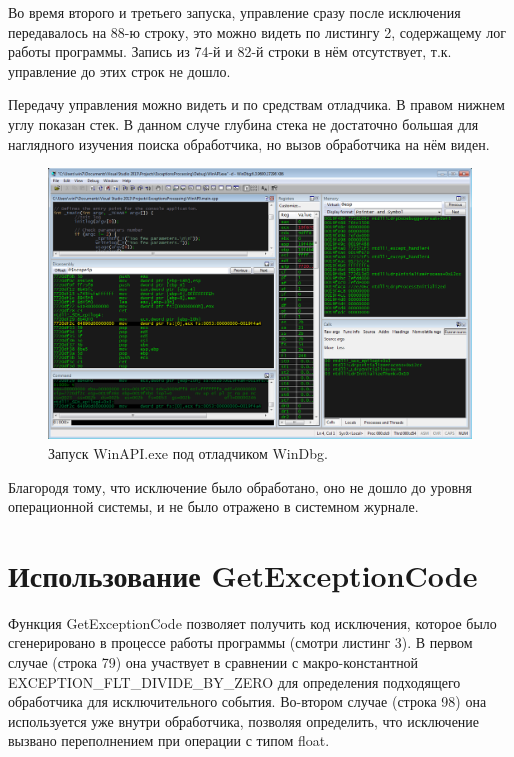 \documentclass[a4paper, 12pt]{report}		%
\begin{document}
Во время второго и третьего запуска, управление сразу после исключения передавалось на 88-ю строку, это можно видеть по листингу 2, содержащему лог работы программы. Запись из 74-й и 82-й строки в нём отсутствует, т.к. управление до этих строк не дошло.



Передачу управления можно видеть и по средствам отладчика. В правом нижнем углу показан стек. В данном случе глубина стека не достаточно большая для наглядного изучения поиска обработчика, но вызов обработчика на нём виден.

\begin{figure}[h!]
\centering
\includegraphics[scale=0.5]{res/002}
\caption{Запуск WinAPI.exe под отладчиком WinDbg.}
\end{figure}

Благородя тому, что исключение было обработано, оно не дошло до уровня операционной системы, и не было отражено в системном журнале.


\chapter*{Использование GetExceptionCode}

Функция GetExceptionCode позволяет получить код исключения, которое было сгенерировано в процессе работы программы (смотри листинг 3). В первом случае (строка 79) она участвует в сравнении с макро-константной EXCEPTION\_FLT\_DIVIDE\_BY\_ZERO для определения подходящего обработчика для исключительного события. Во-втором случае (строка 98) она используется уже внутри обработчика, позволяя определить, что исключение вызвано переполнением при операции с типом float.
\end{document}
